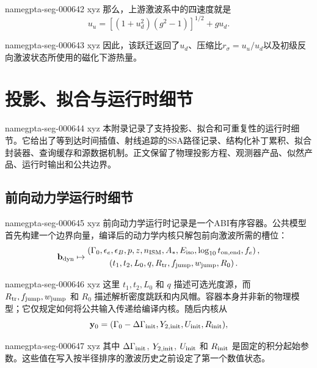 \documentclass[twocolumn]{aastex702}
\makeatletter
\providecommand{\gptareaderanchor}[1]{\pdfdest name{#1} xyz}%
\providecommand{\gptareaderanchor}[1]{\special{pdf:dest (#1) [ @thispage /XYZ @xpos @ypos null ]}}%
\makeatother
\begin{document}
\gptareaderanchor{gpta-seg-000642}%
那么，上游激波系中的四速度就是
\begin{equation}
u_u=\left[(1+u_d^2)(g^2-1)\right]^{1/2}+g u_d .
\end{equation}

\gptareaderanchor{gpta-seg-000643}%
因此，该跃迁返回了\(u_d\)、压缩比\(r_\sigma=u_u/u_d\)以及初级反向激波状态所使用的磁化下游热量。

\section{投影、拟合与运行时细节} \label{app:projection-runtime}


\gptareaderanchor{gpta-seg-000644}%
本附录记录了支持投影、拟合和可重复性的运行时细节。它给出了等到达时间插值、射线追踪的SSA路径记录、结构化补丁累积、拟合封装器、查询缓存和源数据机制。正文保留了物理投影方程、观测器产品、似然产品、运行时输出和公共边界。

\subsection{前向动力学运行时细节}


\gptareaderanchor{gpta-seg-000645}%
前向动力学运行时记录是一个ABI有序容器。公共模型首先构建一个边界向量，编译后的动力学内核只解包前向激波所需的槽位：
\begin{equation}
\mathbf b_{\rm dyn}\mapsto
\begin{gathered}
\left(
\Gamma_0,\epsilon_e,\epsilon_B,p,z,n_{\rm ISM},A_\ast,E_{\rm iso},
\log_{10}t_{{\rm on},\rm end},f_e
\right),\\
\left(
t_1,t_2,L_0,q,R_{\rm tr},f_{\rm jump},w_{\rm jump},R_0
\right).
\end{gathered}
\end{equation}

\gptareaderanchor{gpta-seg-000646}%
这里 \(t_1, t_2, L_0\) 和 \(q\) 描述可选光度源，而 \(R_{\rm tr}, f_{\rm jump}, w_{\rm jump}\) 和 \(R_0\) 描述解析密度跳跃和内风帽。容器本身并非新的物理模型；它仅规定如何将公共输入传递给编译内核。随后内核从
\begin{equation}
\mathbf{y}_0=(\Gamma_0-\Delta\Gamma_{\rm init},
Y_{2,{\rm init}},U_{\rm init},R_{\rm init}),
\end{equation}

\gptareaderanchor{gpta-seg-000647}%
其中 \(\Delta\Gamma_{\rm init}\), \(Y_{2,{\rm init}}\), \(U_{\rm init}\) 和 \(R_{\rm init}\) 是固定的积分起始参数。这些值在写入按半径排序的激波历史之前设定了第一个数值状态。
\end{document}
